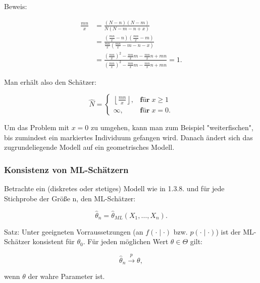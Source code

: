 \documentclass[10pt]{article}
\newcommand{\FZV}{X_1, \ldots, X_n} %
\newcommand{\KW}{\overset{p} \longrightarrow} %
\newenvironment{BSP}[1][]
{\begin{Beispiel}[frametitle=#1]}{\end{Beispiel}}
\begin{document}
\begin{BSP}[Beispiel 1.3.9 (Schätzung der Populationsgröße mit der Capture/Recapture-Methode)]
		Beweis:
		
		\begin{equation*}
			\begin{split}
				\frac{mn}{x} &= \frac{(N-n)(N-m)}{N(N-m-n+x)}\\  
				&= \frac{\left(\frac{mn}{x}-n\right)\left(\frac{mn}{x} -m\right)}{\frac{mn}{x}\left(\frac{mn}{x}-m-n-x\right)}\\
				&= \frac{\left(\frac{mn}{x}\right)^2 -\frac{mn}{x}m -\frac{mn}{x}n +mn} {\left(\frac{mn}{x}\right)^2 - \frac{mn}{x}m -\frac{mn}{x}n + mn} =1.
			\end{split}
		\end{equation*}
		
		Man erhält also den Schätzer:
		
		\begin{equation*}
			\hat{N} = 
			\begin{cases}
				\left\lfloor \frac{mn}{x} \right\rfloor, &\textbf{für} \; x \geq 1 \\
				\infty,  &\textbf{für} \; x =0.
			\end{cases}
		\end{equation*}
		
		Um das Problem mit $x=0$ zu umgehen, kann man zum Beispiel "weiterfischen", bis zumindest ein markiertes Individuum gefangen wird. Danach ändert sich das zugrundeliegende Modell auf ein geometrisches Modell. 
	\end{BSP}
	
	\subsubsection{Konsistenz von ML-Schätzern}
	
	Betrachte ein (diskretes oder stetiges) Modell wie in 1.3.8. und für jede Stichprobe der Größe n, den ML-Schätzer:
	
	\begin{equation*}
		\hat{\theta}_n = \hat{\theta}_{ML}(\FZV).
	\end{equation*}
	
	Satz: Unter geeigneten Vorraussetzungen (an $f(\cdot \mid \cdot)$ bzw. $p(\cdot \mid \cdot)$) ist der ML-Schätzer konsistent für $\theta_0$. Für jeden möglichen Wert $\theta \in \Theta$ gilt:
	
	\begin{equation*}
		\hat{\theta}_n \KW \theta,
	\end{equation*}
	
	wenn $\theta$ der wahre Parameter ist. 
	
\end{document}
